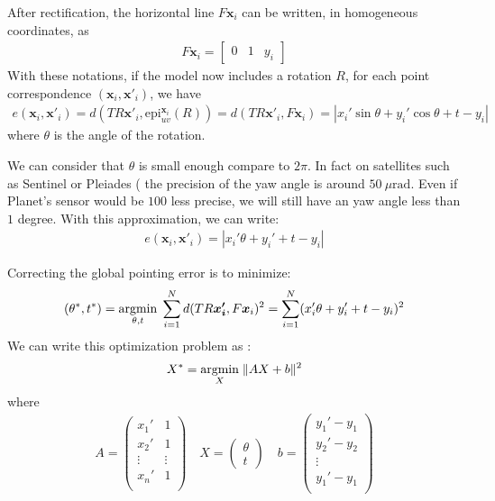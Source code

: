 \documentclass[paper=a4, fontsize=11pt, onecolumn, tikz, dvipsnames, svgnames, x11names]{article}
\begin{document}
After rectification, the horizontal line $F\bm{x}_i$ can be written, in homogeneous coordinates, as
\begin{align*}
F\bm{x}_i =  \begin{bmatrix} 0 & 1 & y_i \end{bmatrix}
\end{align*}
With these notations, if the model now includes a rotation $R$, for each point correspondence $(\bm{x}_i , \bm{x}'_i)$, we have
\begin{align*}
e(\textbf{x}_i, \textbf{x}'_i) = d(TR\bm{x}'_i, \text{epi}^{\bm{x}_i}_{u v}(R)) = d(TR\bm{x}'_i, F\bm{x}_i) = |x_i' \sin \theta   + y_i' \cos \theta  + t - y_i |
\end{align*}
where $\theta$ is the angle of the rotation.

We can consider that $\theta$ is small enough compare to $2\pi$. In fact on satellites such as Sentinel or Pleiades (%
the precision of the yaw angle is around $50~\mu \text{rad}$. Even if Planet's sensor would be $100$ less precise, we will still have an yaw angle less than $1$ degree.
With this approximation, we can write:
\begin{align*}
e(\textbf{x}_i, \textbf{x}'_i) = |x_i' \theta   + y_i' + t - y_i |
\end{align*}

Correcting the global pointing error is to minimize:
\begin{align*}
(\theta^*, t^*) = \underset{\theta,t}{\operatorname{argmin}}\; \sum_{i=1}^N d(TR\bm{x_i'}, F\bm{x}_i)^2 = \sum_{i=1}^N (x_i' \theta   + y_i' + t - y_i)^2
\end{align*}
We can write this optimization problem as :
\begin{align*}
X^* = \underset{X}{\operatorname{argmin}}\; \| AX + b \|^2
\end{align*}
where 
\begin{align*}
A =
\begin{pmatrix}
x_1' & 1 \\
x_2' & 1 \\
\vdots & \vdots \\
x_n' & 1 \\
\end{pmatrix} \quad
X =
\begin{pmatrix}
\theta \\
t
\end{pmatrix} \quad
b =
\begin{pmatrix}
y_1' - y_1\\
y_2' - y_2\\
\vdots\\
y_1' - y_1\\
\end{pmatrix}
\end{align*}
\end{document}

